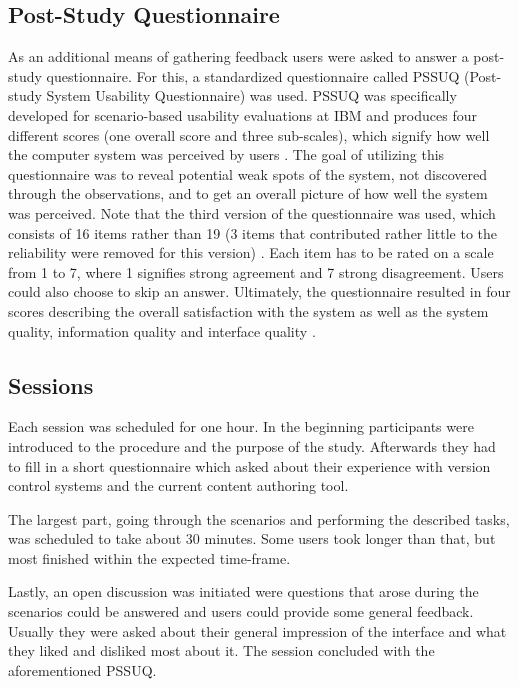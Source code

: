 \subsection{Post-Study Questionnaire}
As an additional means of gathering feedback users were asked to answer a post-study questionnaire. For this, a standardized questionnaire called PSSUQ (Post-study System Usability Questionnaire) was used. PSSUQ was specifically developed for scenario-based usability evaluations at IBM and produces four different scores (one overall score and three sub-scales), which signify how well the computer system was perceived by users \cite{lewis_psychometric_2002}. The goal of utilizing this questionnaire was to reveal potential weak spots of the system, not discovered through the observations, and to get an overall picture of how well the system was perceived. Note that the third version of the questionnaire was used, which consists of 16 items rather than 19 (3 items that contributed rather little to the reliability were removed for this version) \cite{sauro_quantifying_2012}. Each item has to be rated on a scale from 1 to 7, where 1 signifies strong agreement and 7 strong disagreement. Users could also choose to skip an answer. Ultimately, the questionnaire resulted in four scores describing the overall satisfaction with the system as well as the system quality, information quality and interface quality \cite{sauro_quantifying_2012}.

\subsection{Sessions}
Each session was scheduled for one hour. In the beginning participants were introduced to the procedure and the purpose of the study. Afterwards they had to fill in a short questionnaire which asked about their experience with version control systems and the current content authoring tool.

The largest part, going through the scenarios and performing the described tasks, was scheduled to take about 30 minutes. Some users took longer than that, but most finished within the expected time-frame.

Lastly, an open discussion was initiated were questions that arose during the scenarios could be answered and users could provide some general feedback. Usually they were asked about their general impression of the interface and what they liked and disliked most about it. The session concluded with the aforementioned PSSUQ.

